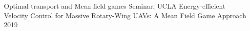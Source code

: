 \vspace{-4mm}

\begin{cvtalks}

  \cvtalk
    {Optimal transport and Mean field games Seminar, UCLA} %
    {Energy-efficient Velocity Control for Massive Rotary-Wing UAVs: A Mean Field Game Approach} %
    {2019} %
\end{cvtalks}

